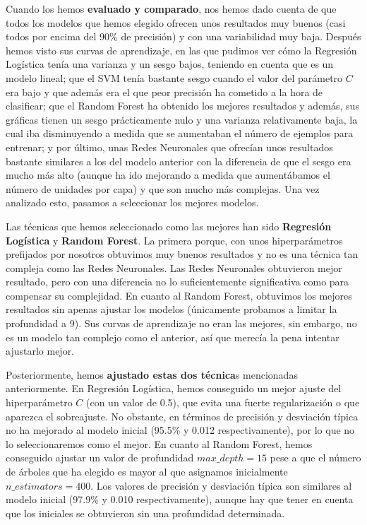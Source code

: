 \documentclass[11pt,a4paper]{article}
\begin{document}
Cuando los hemos \textbf{evaluado y comparado}, nos hemos dado cuenta de que todos los modelos que hemos elegido ofrecen unos resultados muy buenos 
(casi todos por encima del 90\% de precisión) y con una variabilidad muy baja. Después hemos visto sus curvas de aprendizaje, en las que pudimos
ver cómo la Regresión Logística tenía una varianza y un sesgo bajos, teniendo en cuenta que es un modelo lineal; que el SVM tenía bastante sesgo
cuando el valor del parámetro $C$ era bajo y que además era el que peor precisión ha cometido a la hora de clasificar; que el Random Forest
ha obtenido los mejores resultados y además, sus gráficas tienen un sesgo prácticamente nulo y una varianza relativamente baja, la cual 
iba disminuyendo a medida que se aumentaban el número de ejemplos para entrenar; y por último, unas Redes Neuronales que ofrecían unos resultados
bastante similares a los del modelo anterior con la diferencia de que el sesgo era mucho más alto (aunque ha ido mejorando a medida que aumentábamos el
número de unidades por capa) y que son mucho más complejas. Una vez analizado esto, pasamos a seleccionar los mejores modelos.

Las técnicas que hemos seleccionado como las mejores han sido \textbf{Regresión Logística} y \textbf{Random Forest}. La primera porque,
con unos hiperparámetros prefijados por nosotros obtuvimos muy buenos resultados y no es una técnica tan compleja como las Redes
Neuronales. Las Redes Neuronales obtuvieron mejor resultado, pero con una diferencia no lo suficientemente significativa como para
compensar su complejidad. En cuanto al Random Forest, obtuvimos los mejores resultados sin apenas ajustar los modelos (únicamente probamos
a limitar la profundidad a 9). Sus curvas de aprendizaje no eran las mejores, sin embargo, no es un modelo tan complejo como el anterior,
así que merecía la pena intentar ajustarlo mejor.

Posteriormente, hemos \textbf{ajustado estas dos técnica}s mencionadas anteriormente. En Regresión Logística, hemos conseguido un mejor ajuste del
hiperparámetro $C$ (con un valor de 0.5), que evita una fuerte regularización o que aparezca el sobreajuste. No obstante, en términos de
precisión y desviación típica no ha mejorado al modelo inicial (95.5\% y 0.012 respectivamente), por lo que no lo seleccionaremos como el
mejor. En cuanto al Random Forest, hemos conseguido ajustar un valor de profundidad $max\_depth = 15$ pese a que el número de árboles que
ha elegido es mayor al que asignamos inicialmente $n\_estimators = 400$. Los valores de precisión y desviación típica son similares al
modelo inicial (97.9\% y 0.010 respectivamente), aunque hay que tener en cuenta que los iniciales se obtuvieron sin una profundidad
determinada.
\end{document}
